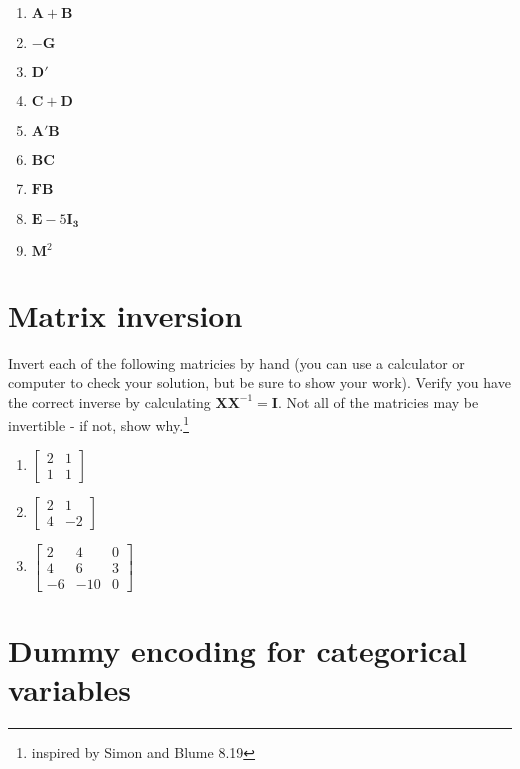 \documentclass[
]{article}
\begin{document}
\begin{enumerate}
\def\labelenumi{\alph{enumi}.}
\item
  \(\mathbf{A} + \mathbf{B}\)
\item
  \(-\mathbf{G}\)
\item
  \(\mathbf{D}'\)
\item
  \(\mathbf{C} + \mathbf{D}\)
\item
  \(\mathbf{A}' \mathbf{B}\)
\item
  \(\mathbf{BC}\)
\item
  \(\mathbf{FB}\)
\item
  \(\mathbf{E} - 5\mathbf{I_3}\)
\item
  \(\mathbf{M}^2\)
\end{enumerate}

\section{Matrix inversion}\label{matrix-inversion}

Invert each of the following matricies by hand (you can use a calculator
or computer to check your solution, but be sure to show your work).
Verify you have the correct inverse by calculating
\(\mathbf{XX}^{-1} = \mathbf{I}\). Not all of the matricies may be
invertible - if not, show why.\footnote{inspired by Simon and Blume 8.19}

\begin{enumerate}
\def\labelenumi{\alph{enumi}.}
\item
  \(\left[ \begin{array}{rr} 2 & 1 \\ 1 & 1 \end{array}\right]\)
\item
  \(\left[ \begin{array}{rr} 2 & 1 \\ 4 & -2 \end{array}\right]\)
\item
  \(\left[ \begin{array}{rrr} 2 & 4 & 0 \\ 4 & 6 & 3 \\ -6 & -10 & 0 \end{array}\right]\)
\end{enumerate}

\section{Dummy encoding for categorical
variables}\label{dummy-encoding-for-categorical-variables}
\end{document}

